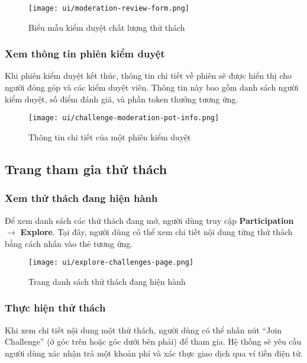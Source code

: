 \begin{figure}[H]
  \centering
  \texttt{[image: ui/moderation-review-form.png]}
  \caption{Biểu mẫu kiểm duyệt chất lượng thử thách}
  \label{fig:moderation-review-form}
\end{figure}

\subsubsection{Xem thông tin phiên kiểm duyệt}

Khi phiên kiểm duyệt kết thúc, thông tin chi tiết về phiên sẽ được hiển thị cho người đóng góp và các kiểm duyệt viên.  
Thông tin này bao gồm danh sách người kiểm duyệt, số điểm đánh giá, và phần token thưởng tương ứng.

\begin{figure}[H]
  \centering
  \texttt{[image: ui/challenge-moderation-pot-info.png]}
  \caption{Thông tin chi tiết của một phiên kiểm duyệt}
  \label{fig:challenge-moderation-pot-info}
\end{figure}

\subsection{Trang tham gia thử thách}

\subsubsection{Xem thử thách đang hiện hành}

Để xem danh sách các thử thách đang mở, người dùng truy cập \textbf{Participation} $\rightarrow$ \textbf{Explore}.  
Tại đây, người dùng có thể xem chi tiết nội dung từng thử thách bằng cách nhấn vào thẻ tương ứng.

\begin{figure}[H]
  \centering
  \texttt{[image: ui/explore-challenges-page.png]}
  \caption{Trang danh sách thử thách đang hiện hành}
  \label{fig:explore-challenges-page}
\end{figure}

\subsubsection{Thực hiện thử thách}

Khi xem chi tiết nội dung một thử thách, người dùng có thể nhấn nút ``Join Challenge'' (ở góc trên hoặc góc dưới bên phải) để tham gia.  
Hệ thống sẽ yêu cầu người dùng xác nhận trả một khoản phí và xác thực giao dịch qua ví tiền điện tử.

